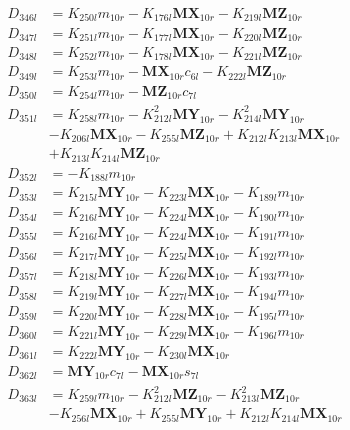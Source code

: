 \begin{align}
D_{346l} &= K_{250l}m_{10r} - K_{176l}\mathbf{MX}_{10r} - K_{219l}\mathbf{MZ}_{10r} \nonumber \\
D_{347l} &= K_{251l}m_{10r} - K_{177l}\mathbf{MX}_{10r} - K_{220l}\mathbf{MZ}_{10r} \nonumber \\
D_{348l} &= K_{252l}m_{10r} - K_{178l}\mathbf{MX}_{10r} - K_{221l}\mathbf{MZ}_{10r} \nonumber \\
D_{349l} &= K_{253l}m_{10r} - \mathbf{MX}_{10r}c_{6l} - K_{222l}\mathbf{MZ}_{10r} \nonumber \\
D_{350l} &= K_{254l}m_{10r} - \mathbf{MZ}_{10r}c_{7l} \nonumber \\
D_{351l} &= K_{258l}m_{10r} - K_{212l}^2\mathbf{MY}_{10r} - K_{214l}^2\mathbf{MY}_{10r}  \nonumber \\
&- K_{206l}\mathbf{MX}_{10r} - K_{255l}\mathbf{MZ}_{10r} + K_{212l}K_{213l}\mathbf{MX}_{10r}  \nonumber \\
&+ K_{213l}K_{214l}\mathbf{MZ}_{10r} \nonumber \\
D_{352l} &= -K_{188l}m_{10r} \nonumber \\
D_{353l} &= K_{215l}\mathbf{MY}_{10r} - K_{223l}\mathbf{MX}_{10r} - K_{189l}m_{10r} \nonumber \\
D_{354l} &= K_{216l}\mathbf{MY}_{10r} - K_{224l}\mathbf{MX}_{10r} - K_{190l}m_{10r} \nonumber \\
D_{355l} &= K_{216l}\mathbf{MY}_{10r} - K_{224l}\mathbf{MX}_{10r} - K_{191l}m_{10r} \nonumber \\
D_{356l} &= K_{217l}\mathbf{MY}_{10r} - K_{225l}\mathbf{MX}_{10r} - K_{192l}m_{10r} \nonumber \\
D_{357l} &= K_{218l}\mathbf{MY}_{10r} - K_{226l}\mathbf{MX}_{10r} - K_{193l}m_{10r} \nonumber \\
D_{358l} &= K_{219l}\mathbf{MY}_{10r} - K_{227l}\mathbf{MX}_{10r} - K_{194l}m_{10r} \nonumber \\
D_{359l} &= K_{220l}\mathbf{MY}_{10r} - K_{228l}\mathbf{MX}_{10r} - K_{195l}m_{10r} \nonumber \\
D_{360l} &= K_{221l}\mathbf{MY}_{10r} - K_{229l}\mathbf{MX}_{10r} - K_{196l}m_{10r} \nonumber \\
D_{361l} &= K_{222l}\mathbf{MY}_{10r} - K_{230l}\mathbf{MX}_{10r} \nonumber \\
D_{362l} &= \mathbf{MY}_{10r}c_{7l} - \mathbf{MX}_{10r}s_{7l} \nonumber \\
D_{363l} &= K_{259l}m_{10r} - K_{212l}^2\mathbf{MZ}_{10r} - K_{213l}^2\mathbf{MZ}_{10r}  \nonumber \\
&- K_{256l}\mathbf{MX}_{10r} + K_{255l}\mathbf{MY}_{10r} + K_{212l}K_{214l}\mathbf{MX}_{10r}  \nonumber \\

\end{align}
